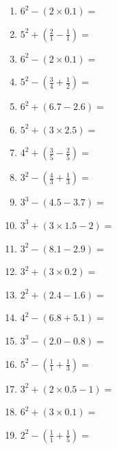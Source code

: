 \documentclass[12pt]{article}
\begin{document}
\begin{enumerate}
\newpage
\item \large $ 6^{2} - (2 \times 0.1) = $ \vspace{1.4cm}
\item \large $ 5^{2} + (\frac{2}{1} - \frac{1}{1}) = $ \vspace{1.4cm}
\item \large $ 6^{2} - (2 \times 0.1) = $ \vspace{1.4cm}
\item \large $ 5^{2} - (\frac{3}{4} + \frac{1}{2}) = $ \vspace{1.4cm}
\item \large $ 6^{2} + (6.7 - 2.6) = $ \vspace{1.4cm}
\item \large $ 5^{2} + (3 \times 2.5) = $ \vspace{1.4cm}
\item \large $ 4^{2} + (\frac{3}{5} - \frac{2}{5}) = $ \vspace{1.4cm}
\item \large $ 3^{2} - (\frac{4}{3} + \frac{1}{3}) = $ \vspace{1.4cm}
\item \large $ 3^{3} - (4.5 - 3.7) = $ \vspace{1.4cm}
\item \large $ 3^{3} + (3 \times 1.5 - 2) = $ \vspace{1.4cm}
\newpage
\item \large $ 3^{2} - (8.1 - 2.9) = $ \vspace{1.4cm}
\item \large $ 3^{2} + (3 \times 0.2) = $ \vspace{1.4cm}
\item \large $ 2^{2} + (2.4 - 1.6) = $ \vspace{1.4cm}
\item \large $ 4^{2} - (6.8 + 5.1) = $ \vspace{1.4cm}
\item \large $ 3^{3} - (2.0 - 0.8) = $ \vspace{1.4cm}
\item \large $ 5^{2} - (\frac{1}{1} + \frac{1}{3}) = $ \vspace{1.4cm}
\item \large $ 3^{2} + (2 \times 0.5 - 1) = $ \vspace{1.4cm}
\item \large $ 6^{2} + (3 \times 0.1) = $ \vspace{1.4cm}
\item \large $ 2^{2} - (\frac{1}{1} + \frac{1}{5}) = $ \vspace{1.4cm}

\end{enumerate}
\end{document}
